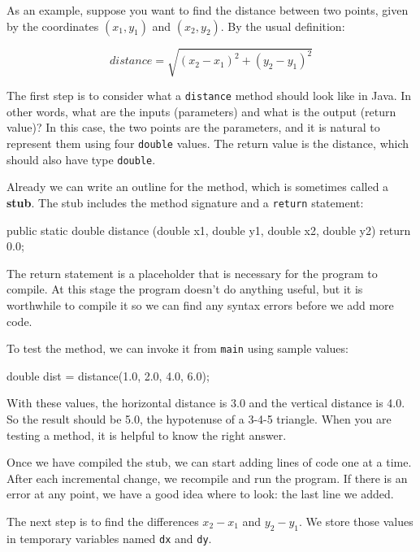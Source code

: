 \documentclass[12pt]{book}
\theoremstyle{exercise}
\newcommand{\java}[1]{\verb"#1"}
\newcommand{\java}[1]{\lstinline{#1}} %
\begin{document}
As an example, suppose you want to find the distance between two points, given by the coordinates $(x_1, y_1)$ and $(x_2, y_2)$.
By the usual definition:

\[ distance = \sqrt{(x_2 - x_1)^2 +(y_2 - y_1)^2} \]

The first step is to consider what a \java{distance} method should look like in Java.
In other words, what are the inputs (parameters) and what is the output (return value)?
In this case, the two points are the parameters, and it is natural to represent them using four \java{double} values.
The return value is the distance, which should also have type \java{double}.


Already we can write an outline for the method, which is sometimes called a {\bf stub}.
The stub includes the method signature and a \java{return} statement:

\begin{code}
    public static double distance
            (double x1, double y1, double x2, double y2) {
        return 0.0;
    }
\end{code}

The return statement is a placeholder that is necessary for the program to compile.
At this stage the program doesn't do anything useful, but it is worthwhile to compile it so we can find any syntax errors before we add more code.

To test the method, we can invoke it from \java{main} using sample values:

\begin{code}
    double dist = distance(1.0, 2.0, 4.0, 6.0);
\end{code}

With these values, the horizontal distance is 3.0 and the vertical distance is 4.0.
So the result should be 5.0, the hypotenuse of a 3-4-5 triangle.
When you are testing a method, it is helpful to know the right answer.

Once we have compiled the stub, we can start adding lines of code one at a time.
After each incremental change, we recompile and run the program.
If there is an error at any point, we have a good idea where to look: the last line we added.

The next step is to find the differences $x_2 - x_1$ and $y_2 - y_1$.
We store those values in temporary variables named \java{dx} and \java{dy}.
\end{document}
